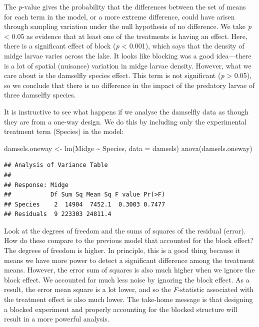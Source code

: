 \documentclass[
]{book}
\newenvironment{Shaded}{\begin{snugshade}}{\end{snugshade}}
\newcommand{\AttributeTok}[1]{\textcolor[rgb]{0.77,0.63,0.00}{#1}}
\newcommand{\FunctionTok}[1]{\textcolor[rgb]{0.00,0.00,0.00}{#1}}
\newcommand{\NormalTok}[1]{#1}
\newcommand{\OtherTok}[1]{\textcolor[rgb]{0.56,0.35,0.01}{#1}}
\newcommand{\SpecialCharTok}[1]{\textcolor[rgb]{0.00,0.00,0.00}{#1}}
\begin{document}
The \emph{p}-value gives the probability that the differences between the set of means for each term in the model, or a more extreme difference, could have arisen through sampling variation under the null hypothesis of no difference. We take \emph{p} \textless{} 0.05 as evidence that at least one of the treatments is having an effect. Here, there is a significant effect of block (\emph{p} \textless{} 0.001), which says that the density of midge larvae varies across the lake. It looks like blocking was a good idea---there is a lot of spatial (nuisance) variation in midge larvae density. However, what we care about is the damselfly species effect. This term is not significant (\emph{p} \textgreater{} 0.05), so we conclude that there is no difference in the impact of the predatory larvae of three damselfly species.

It is instructive to see what happens if we analyse the damselfly data as though they are from a one-way design. We do this by including only the experimental treatment term (Species) in the model:

\begin{Shaded}
\begin{Highlighting}[]
\NormalTok{damsels.oneway }\OtherTok{\textless{}{-}} \FunctionTok{lm}\NormalTok{(Midge }\SpecialCharTok{\textasciitilde{}}\NormalTok{ Species, }\AttributeTok{data =}\NormalTok{ damsels)}
\FunctionTok{anova}\NormalTok{(damsels.oneway)}
\end{Highlighting}
\end{Shaded}

\begin{verbatim}
## Analysis of Variance Table
## 
## Response: Midge
##           Df Sum Sq Mean Sq F value Pr(>F)
## Species    2  14904  7452.1  0.3003 0.7477
## Residuals  9 223303 24811.4
\end{verbatim}

Look at the degrees of freedom and the sums of squares of the residual (error). How do these compare to the previous model that accounted for the block effect? The degrees of freedom is higher. In principle, this is a good thing because it means we have more power to detect a significant difference among the treatment means. However, the error sum of squares is also much higher when we ignore the block effect. We accounted for much less noise by ignoring the block effect. As a result, the error mean square is a lot lower, and so the \emph{F}-statistic associated with the treatment effect is also much lower. The take-home message is that designing a blocked experiment and properly accounting for the blocked structure will result in a more powerful analysis.
\end{document}
